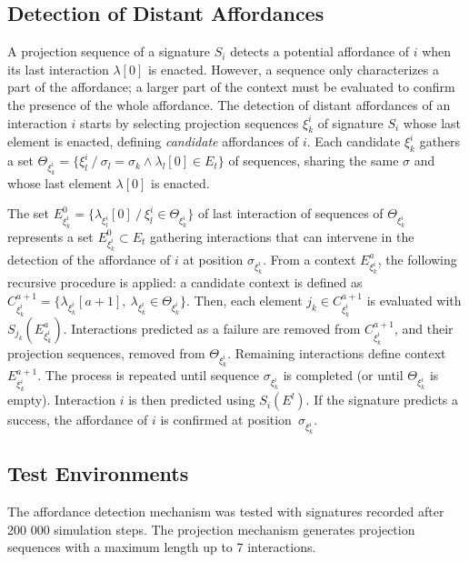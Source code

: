 \documentclass[conference]{IEEEtran}
\begin{document}
\subsection{Detection of Distant Affordances}\label{detection}


A projection sequence of a signature $S_i$ detects a potential affordance of $i$ when its last interaction $\lambda[0]$ is enacted.
However, a sequence only characterizes a part of the affordance; a larger part of the context must be evaluated to confirm the presence of the whole affordance.
The detection of distant affordances of an interaction $i$ starts by selecting projection sequences $\xi_k^i$ of signature $S_i$ whose last element is enacted, defining \textit{candidate} affordances of $i$. Each candidate $\xi_k^i$ gathers a set $\Theta_{\xi_k^i} = \{\xi_l^i ~/~ \sigma_l = \sigma_k \wedge \lambda_l[0] \in E_t\}$ of sequences, sharing the same $\sigma$ and whose last element $\lambda[0]$ is enacted.

The set $E_{\xi_k^i}^0=\{\lambda_{\xi_l^i}[0] ~/~\xi_l^i \in \Theta_{\xi_k^i}\}$ of last interaction of sequences of $\Theta_{\xi_k^i}$ represents a set $E_{\xi_k^i}^0 \subset E_t$ gathering interactions that can intervene in the detection of the affordance of $i$ at position $\sigma_{\xi_k^i}$.
From a context $E_{\xi_k^i}^a$, the following recursive procedure is applied: a candidate context is defined as $C_{\xi_k^i}^{a+1} = \{\lambda_{\xi_k^i}[a+1] ,~ \lambda_{\xi_k^i} \in \Theta_{\xi_k^i} \} $. 
Then, each element $j_k \in C_{\xi_k^i}^{a+1}$ is evaluated with $S_{j_k}(E_{\xi_k^i}^a)$. 
Interactions predicted as a failure are removed from $C_{\xi_k^i}^{a+1}$, and their projection sequences, removed from $\Theta_{\xi_k^i}$. 
Remaining interactions define context $E_{\xi_k^i}^{a+1}$. 
The process is repeated until sequence $\sigma_{\xi_k^i}$ is completed (or until $\Theta_{\xi_k^i}$ is empty). 
Interaction $i$ is then predicted using $S_i(E^l)$. 
If the signature predicts a success, the affordance of $i$ is confirmed at position~$\sigma_{\xi_k^i}$.


\subsection{Test Environments}\label{test}

The affordance detection mechanism was tested with signatures recorded after 200 000 simulation steps.
The projection mechanism generates projection sequences with a maximum length up to 7 interactions.
\end{document}

